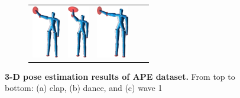 \begin{figure}
\begin{subfigure}[b]{1\linewidth}
\begin{tabular}{c|cccc}
			\includegraphics[height=2.3cm]{fig/body/APE/wave12.png} &
			\includegraphics[height=2.3cm]{fig/body/APE/wave13.png} & 
			\includegraphics[height=2.3cm]{fig/body/APE/wave14.png} 
		\end{tabular}
		\label{fig/body/APE/wave1} 
	\end{subfigure}
	\caption{\textbf{3-D pose estimation results of APE dataset.} From top to bottom: (a) clap, (b) dance, and (c) wave 1}
	\label{fig/body/APE2}
\end{figure}

